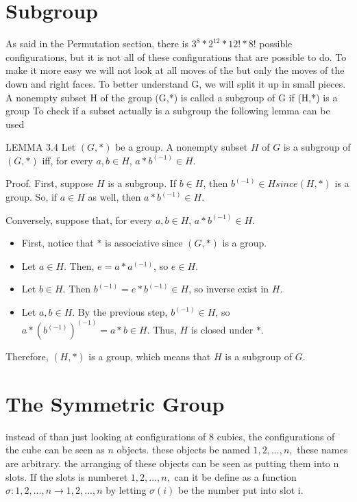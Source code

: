 \section{Subgroup}
As said in the Permutation section, there is $3^8*2^{12}*12!*8!$ possible configurations, but it is not all of these configurations that are possible to do.  To make it more easy we will not look at all moves of the \rubik{} but only the moves of the down and right faces. To better understand G, we will split it up in small pieces.
A nonempty subset H of the group (G,*) is called a subgroup of G if (H,*) is a group
To check if a subset actually is a subgroup the following lemma can be used

LEMMA 3.4
Let $(G,*)$ be a group. A nonempty subset $H$ of $G$ is a subgroup of $(G,*)$ iff, for every $a, b \in H$, $a * b^(-1) \in H$.

Proof. First, suppose $H$ is a subgroup. If $b \in H$, then $b^(-1) \in H since (H,*)$ is a group. So, if $a \in H$ as well, then $a * b^(-1) \in H$.

Conversely, suppose that, for every $a, b \in H$, $a * b^(-1) \in H$.

\begin {itemize}
\item First, notice that $*$ is associative since $(G,*)$ is a group.
\item Let $a \in H$. Then, $e = a * a^(-1)$, so $e \in H$.
\item Let $b \in H$. Then $b^(-1) = e * b^(-1) \in H$, so inverse exist in $H$.
\item Let $a, b \in H$. By the previous step, $b^(-1) \in H$, so $a* (b^(-1))^(-1) = a* b \in H$. Thus, $H$ is closed under $*$.
\end {itemize}

Therefore, $(H,*)$ is a group, which means that $H$ is a subgroup of $G$.

\section{The Symmetric Group}

instead of than just looking at configurations of 8 cubies, the configurations of the cube can be seen as $n$ objects. 
these objects be named $1, 2, . . . , n,$ these names are arbitrary. the arranging of these objects can be seen as
putting them into n slots. If the slots is numberet $1, 2, . . . , n,$ can it be define as a function $\sigma : {1, 2, . . . , n} \rightarrow
{1, 2, . . . , n}$ by letting $\sigma(i)$ be the number put into slot i.

